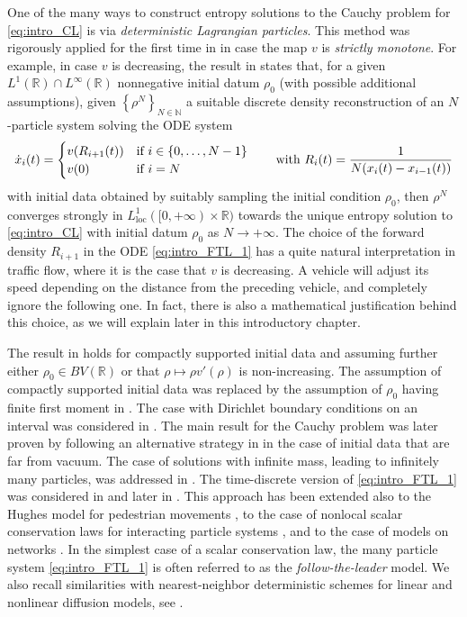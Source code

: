 \documentclass[reqno,oneside]{amsart}
\theoremstyle{plain}
\newcommand{\R}{\mathbb{R}}
\newcommand{\N}{\mathbb{N}}
\begin{document}
One of the many ways to construct entropy solutions to the Cauchy problem for \eqref{eq:intro_CL} is
via \emph{deterministic Lagrangian particles}. This method was rigorously applied for the first time in \cite{DR} in case the map $v$ is \emph{strictly monotone}. For example, in case $v$ is decreasing, the result in \cite{DR} states that, for a given $L^1(\R)\cap L^\infty(\R)$ nonnegative initial datum $\rho_0$ (with possible additional assumptions), given $\left\{\rho^N\right\}_{N\in \N}$ a suitable discrete density reconstruction of an $N$-particle system solving the ODE system
\begin{equation}\label{eq:intro_FTL_1}
    \dot{x}_i(t)=\begin{cases}
        v(R_{i+1}(t)) & \hbox{if $i\in\{0,\ldots,N-1\}$}\\
        v(0) & \hbox{if $i=N$}
    \end{cases}\qquad \hbox{with}\  R_i(t)=\frac{1}{N(x_i(t)-x_{i-1}(t))}
\end{equation}
with initial data obtained by suitably sampling the initial condition $\rho_0$, then $\rho^N$
converges strongly in $L^1_{\mathrm{loc}}([0,+\infty)\times \R)$ towards the unique entropy solution to \eqref{eq:intro_CL} with initial datum $\rho_0$ as $N\rightarrow+\infty$. The choice of the forward density $R_{i+1}$ in the ODE \eqref{eq:intro_FTL_1} has a quite natural interpretation in traffic flow, where it is the case that $v$ is decreasing. A vehicle will adjust its speed depending on the distance from the preceding vehicle, and completely ignore the following one. In fact, there is also a mathematical justification behind this choice, as we will explain later in this introductory chapter. 

The result in \cite{DR} holds for compactly supported initial data and assuming further either $\rho_0\in BV(\R)$ or that $\rho \mapsto \rho v'(\rho)$ is non-increasing. The assumption of compactly supported initial data was replaced by the assumption of $\rho_0$ having finite first moment in \cite{DFR}. The case with Dirichlet boundary conditions on an interval was considered in \cite{DFRR2}. The main result for the Cauchy problem was later proven by following an alternative strategy in \cite{HR1,HR2} in the case of initial data that are far from vacuum. The case of solutions with infinite mass, leading to infinitely many particles, was addressed in \cite{Marc}. The time-discrete version of \eqref{eq:intro_FTL_1} was considered in \cite{HR2} and later in \cite{DFIR}. This approach has been extended also to the Hughes model for pedestrian movements \cite{DFRR,ARS}, to the case of nonlocal scalar conservation laws for interacting particle systems \cite{DFRad,FR,RS}, and to the case of models on networks \cite{Card}. In the simplest case of a scalar conservation law, the many particle system \eqref{eq:intro_FTL_1} is often referred to as the \emph{follow-the-leader} model. We also recall similarities with nearest-neighbor deterministic schemes for linear and nonlinear diffusion models, see \cite{russo,gosse,matthes,DM}.
\end{document}
